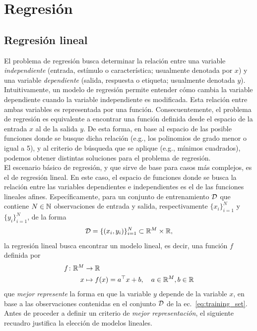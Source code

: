 
\section{Regresión} 

\subsection{Regresión lineal}

El problema de regresión busca determinar la relación entre una variable \emph{independiente} (entrada, estímulo o característica; usualmente denotada por $x$) y una variable \emph{dependiente} (salida, respuesta o etiqueta; usualmente denotada $y$). Intuitivamente, un modelo de regresión permite entender cómo cambia la variable dependiente cuando la variable independiente es modificada. Esta relación entre ambas variables es representada por una función. Consecuentemente, el problema de regresión es equivalente a encontrar una función definida desde el espacio de la entrada $x$ al de la salida $y$. De esta forma, en base al espacio de las posible funciones donde se busque dicha relación (e.g., los polinomios de grado menor o igual a 5), y al criterio de búsqueda que se aplique (e.g., mínimos cuadrados), podemos obtener distintas soluciones para el problema de regresión.\\

El escenario básico de regresión, y que sirve de base para casos más complejos, es el de regresión lineal. En este caso, el espacio de funciones donde se busca la relación entre las variables dependientes e independientes es el de las funciones lineales afines. Específicamente, para un conjunto de entrenamiento ${\mathcal D}$ que contiene $N\in{\mathbb N}$ observaciones de entrada y salida, respectivamente $\{x_i\}_{i=1}^N$ y $\{y_i\}_{i=1}^N$, de la forma
\begin{equation}
	{\mathcal D}=\{(x_i,y_i)\}_{i=1}^N\subset \mathbb{R}^M \times \mathbb{R},
	\label{eq:training_set}
\end{equation}
la regresión lineal busca encontrar un modelo lineal, es decir, una función $f$ definida por 
\begin{align}
  f \colon \mathbb{R}^M &\to \mathbb{R}\nonumber\\
  x &\mapsto f(x)=a^\top x + b,\quad a\in\mathbb{R}^M,b\in\mathbb{R}
   \label{eq:reg_lin_fn} 
\end{align}
que \emph{mejor represente} la forma en que la variable $y$ depende de la variable $x$, en base a las observaciones contenidas en el conjunto ${\mathcal D}$ de la ec.~\eqref{eq:training_set}. Antes de proceder a definir un criterio de \emph{mejor representación}, el siguiente recuadro justifica la elección de modelos lineales. 

